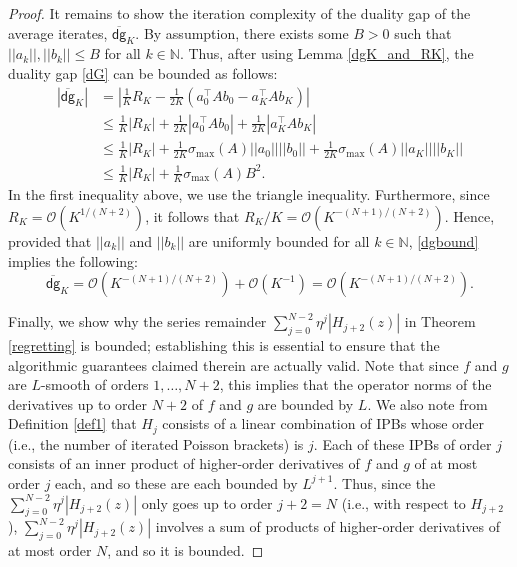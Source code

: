 \documentclass[11pt]{article}
\newcommand{\N}{\mathbb{N}}
\newcommand{\lnorm}{\left|\left|}
\newcommand{\rnorm}{\right|\right|}
\newcommand{\dg}{\textsf{dg}}
\begin{document}
\begin{proof}
It remains to show the iteration complexity of the duality gap of the average iterates, $\overline{\dg}_{K}$. By assumption, there exists some $B>0$ such that $\lnorm a_k\rnorm,\lnorm b_k\rnorm\leq B$ for all $k\in\N$. Thus, after using Lemma \ref{dgK_and_RK}, the duality gap \eqref{dG} can be bounded as follows:
\begin{align}
    \left|\overline{\dg}_{K}\right|
    &=\left|\frac{1}{K}R_{K}-\frac{1}{2K}\left(a_{0}^{\top}Ab_{0}-a_{K}^{\top}Ab_{K}\right)\right| \nonumber\\
    &\le \frac{1}{K}\left|R_{K}\right|+\frac{1}{2K}\left|a_{0}^{\top}Ab_{0}\right|+\frac{1}{2K}\left|a_{K}^{\top}Ab_{K}\right|\nonumber\\
    &\leq \frac{1}{K}\left|R_{K}\right|+\frac{1}{2K}\sigma_{\max}\left(A\right)\lnorm a_{0}\rnorm\lnorm b_{0}\rnorm+\frac{1}{2K}\sigma_{\max}\left(A\right)\lnorm a_{K}\rnorm\lnorm b_{K}\rnorm \nonumber \\ 
    &\leq\frac{1}{K}\left|R_{K}\right|+\frac{1}{K}\sigma_{\max}\left(A\right)B^{2}.\label{dgbound}
\end{align}
In the first inequality above, we use the triangle inequality.
Furthermore, since $R_{K}=\mathcal{O}\left(K^{1/(N+2)}\right)$, it follows that $R_{K}/K=\mathcal{O}\left(K^{-(N+1)/(N+2)}\right)$. Hence, provided that $\lnorm a_k\rnorm$ and $\lnorm b_k\rnorm$ are uniformly bounded for all $k\in\N$, \eqref{dgbound} implies the following: 
$$\overline{\dg}_{K}=\mathcal{O}\left(K^{-(N+1)/(N+2)}\right)+\mathcal{O}\left(K^{-1}\right)=\mathcal{O}\left(K^{-(N+1)/(N+2)}\right).$$

Finally, we show why the series remainder $\sum_{j=0}^{N-2}{\eta^{j}\left|H_{j+2}(z)\right|}$ in Theorem \ref{regretting} is bounded; establishing this is essential to ensure that the algorithmic guarantees claimed therein are actually valid. 
Note that since $f$ and $g$ are $L$-smooth of orders $1,\dots,N+2$, this implies that the operator norms of the derivatives up to order $N+2$ of $f$ and $g$ are bounded by $L$.
We also note from Definition \ref{def1} that $H_{j}$ consists of a linear combination of IPBs whose order (i.e., the number of iterated Poisson brackets) is $j$. 
Each of these IPBs of order $j$ consists of an inner product of higher-order derivatives of $f$ and $g$ of at most order $j$ each, and so these are each bounded by $L^{j+1}$. 
Thus, since the $\sum_{j=0}^{N-2}{\eta^{j}\left|H_{j+2}(z)\right|}$ only goes up to order $j+2=N$ (i.e., with respect to $H_{j+2}$), $\sum_{j=0}^{N-2}{\eta^{j}\left|H_{j+2}(z)\right|}$ involves a sum of products of higher-order derivatives of at most order $N$, and so it is bounded.
\end{proof}
\end{document}
